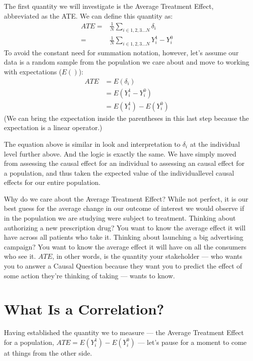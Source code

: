\documentclass[letterpaper,10pt,english]{jupyterBook}
\begin{document}
\sphinxAtStartPar
The first quantity we will investigate is the Average Treatment Effect, abbreviated as the ATE. We can define this quantity as:
\begin{equation*}
\begin{split}
ATE =& \frac{1}{N}\sum_{i \in {1, 2, 3 ... N}}\delta_i \\
=& \frac{1}{N}\sum_{i \in {1, 2, 3 ... N}}Y^1_i - Y^0_i
\end{split}
\end{equation*}
\sphinxAtStartPar
To avoid the constant need for summation notation, however, let’s assume our data is a random sample from the population we care about and move to working with expectations (\(E()\)):
\begin{equation*}
\begin{split}
ATE & = E(\delta_i) \\
& = E(Y^1_i - Y^0_i) \\
& = E(Y^1_i) - E(Y^0_i)
\end{split}
\end{equation*}
\sphinxAtStartPar
(We can bring the expectation inside the parentheses in this last step because the expectation is a linear operator.)

\sphinxAtStartPar
The equation above is similar in look and interpretation to \(\delta_i\) at the individual level further above. And the logic is exactly the same. We have simply moved from assessing the causal effect for an individual to assessing an  causal effect for a population, and thus taken the expected value of the individual\sphinxhyphen{}level causal effects for our entire population.

\sphinxAtStartPar
Why do we care about the Average Treatment Effect? While not perfect, it is our best guess for the average change in our outcome of interest we would observe if  in the population we are studying were subject to treatment. Thinking about authorizing a new prescription drug? You want to know the average effect it will have across all patients who take it. Thinking about launching a big advertising campaign? You want to know the average effect it will have on all the consumers who see it. \(ATE\), in other words, is the quantity your stakeholder — who wants you to answer a Causal Question because they want you to predict the effect of some action they’re thinking of taking — wants to know.


\section{What Is a Correlation?}
\label{\detokenize{35_causal/10_potential_outcomes:what-is-a-correlation}}
\sphinxAtStartPar
Having established the quantity we  to measure — the Average Treatment Effect for a population, \(ATE = E(Y^1_i) - E(Y^0_i)\) — let’s pause for a moment to come at things from the other side.
\end{document}
